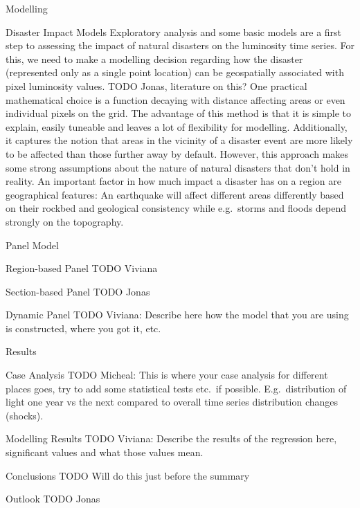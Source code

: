 \documentclass[12pt,fleqn,leqno,letterpaper]{article}
\begin{document}
\begin{section}{Modelling}
  \begin{subsection}{Disaster Impact Models}
    Exploratory analysis and some basic models are a first step to assessing the impact of natural disasters on the luminosity time series. For this, we need to make a modelling decision regarding how the disaster (represented only as a single point location) can be geospatially associated with pixel luminosity values. TODO Jonas, literature on this?
    One practical mathematical choice is a function decaying with distance affecting areas or even individual pixels on the grid. The advantage of this method is that it is simple to explain, easily tuneable and leaves a lot of flexibility for modelling. Additionally, it captures the notion that areas in the vicinity of a disaster event are more likely to be affected than those further away by default. However, this approach makes some strong assumptions about the nature of natural disasters that don't hold in reality. An important factor in how much impact a disaster has on a region are geographical features: An earthquake will affect different areas differently based on their rockbed and geological consistency while e.g.\ storms and floods depend strongly on the topography.
  \end{subsection}
  \begin{subsection}{Panel Model}
    \begin{subsubsection}{Region-based Panel}
      TODO Viviana
    \end{subsubsection}
    \begin{subsubsection}{Section-based Panel}
      TODO Jonas
    \end{subsubsection}
    \begin{subsubsection}{Dynamic Panel}
      TODO Viviana: Describe here how the model that you are using is constructed, where you got it, etc.
    \end{subsubsection}
  \end{subsection}
\end{section}

\begin{section}{Results}
  \begin{subsection}{Case Analysis}
    TODO Micheal: This is where your case analysis for different places goes, try to add some statistical tests etc.\ if possible. E.g.\ distribution of light one year vs the next compared to overall time series distribution changes (shocks).
  \end{subsection}
  \begin{subsection}{Modelling Results}
    TODO Viviana: Describe the results of the regression here, significant values and what those values mean.
  \end{subsection}
  \begin{subsection}{Conclusions}
    TODO Will do this just before the summary
  \end{subsection}
  \begin{subsection}{Outlook}
    TODO Jonas
  \end{subsection}
\end{section}


\end{document}
